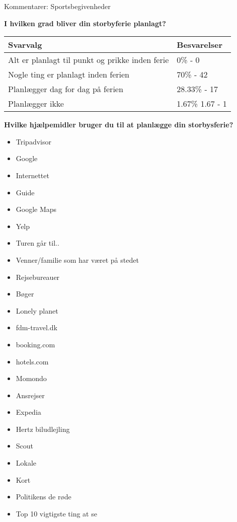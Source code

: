 Kommentarer:
Sportsbegivenheder\newline

\textbf{I hvilken grad bliver din storbyferie planlagt?}

    \begin{tabular}{| l | l |}
    \hline
    Svarvalg & Besvarelser \\ \hline
    Alt er planlagt til punkt og prikke inden ferie & 0\% - 0 \\ \hline
    Nogle ting er planlagt inden ferien & 70\% - 42 \\ \hline
    Planlægger dag for dag på ferien & 28.33\% - 17 \\ \hline
    Planlægger ikke & 1.67\% 1.67 - 1 \\
    \hline
    \end{tabular}
\newline
\newline

\textbf{Hvilke hjælpemidler bruger du til at planlægge din storbysferie?}

\begin{itemize}
	\item Tripadvisor
	\item Google
	\item Internettet
	\item Guide
	\item Google Maps
	\item Yelp
	\item Turen går til..
	\item Venner/familie som har været på stedet
	\item Rejsebureauer
	\item Bøger
	\item Lonely planet
	\item fdm-travel.dk
	\item booking.com
	\item hotels.com
	\item Momondo
	\item Ansrejser
	\item Expedia
	\item Hertz biludlejling
	\item Scout
	\item Lokale
	\item Kort
	\item Politikens de røde
	\item Top 10 vigtigste ting at se\newline
	
\end{itemize}

